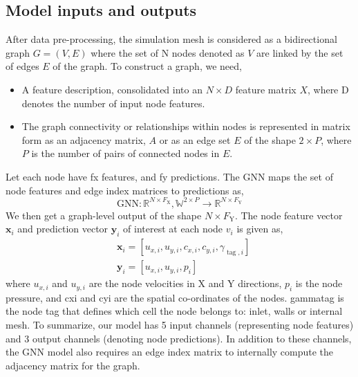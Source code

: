\subsection{Model inputs and outputs}
After data pre-processing, the simulation mesh is considered as a bidirectional graph $G = (V, E)$ where the set of \gls{N} nodes denoted as $V$ are linked by the set of edges $E$ of the graph. To construct a graph, we need,
\begin{itemize}
\item A feature description, consolidated into an $N \times D$ feature matrix $X$, where \gls{D} denotes the number of input node features.
\item The graph connectivity or relationships within nodes is represented in matrix form as an adjacency matrix, $A$ or as an edge set $E$ of the shape $2 \times P$, where $P$ is the number of pairs of connected nodes in $E$.
\end{itemize}
Let each node have \gls{fx} features, and \gls{fy} predictions. The GNN maps the set of node features and edge index matrices to predictions as, 
\begin{equation}
    \mathrm{GNN}: \mathbb{R}^{{N} \times F_{\mathrm{X}}}, \mathbb{W}^{2 \times P} \rightarrow \mathbb{R}^{{N} \times F_{\mathrm{Y}}}
    \end{equation}
We then get a graph-level output of the shape ${N} \times F_{\mathrm{Y}}$. The node feature vector $\mathbf{x}_i$ and prediction vector $\mathbf{y}_i$ of interest at each node $v_i$ is given as,
\begin{equation}
    \begin{aligned}
    & \mathbf{x}_i=\left[u_{x, i}, u_{y, i},c_{x, i}, c_{y, i}, \gamma_{\operatorname{tag}, i}\right] \\
    & \mathbf{y}_i=\left[u_{x, i}, u_{y, i}, p_i\right]
    \end{aligned}
\end{equation}
where $u_{x, i}$ and $u_{y, i}$ are the node velocities in X and Y directions, $p_i$ is the node pressure, and \gls{cxi} and \gls{cyi} are the spatial co-ordinates of the nodes. \gls{gammatag} is the node tag that defines which cell the node belongs to: inlet, walls or internal mesh. To summarize, our model has 5 input channels (representing node features) and 3 output channels (denoting node predictions). In addition to these channels, the GNN model also requires an edge index matrix to internally compute the adjacency matrix for the graph. 
